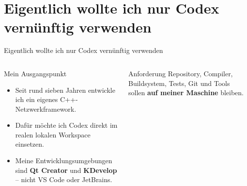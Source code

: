 \documentclass[\fhformat,10pt]{style/fh-ooe}
\newcommand{\CodexLink}{\href{https://github.com/openai/codex}{OpenAI Codex}}
\begin{document}

\section{Eigentlich wollte ich nur Codex vernünftig verwenden}
\begin{frame}{Eigentlich wollte ich nur Codex vernünftig verwenden}
\begin{columns}[T]
\centering
\vspace{0.75em}
\begin{block}{Mein Ausgangspunkt}
\begin{itemize}
  \item Seit rund sieben Jahren entwickle ich ein eigenes C++-Netzwerkframework.
  \item Dafür möchte ich Codex direkt im realen lokalen Workspace einsetzen.
  \item Meine Entwicklungsumgebungen sind \textbf{Qt Creator} und \textbf{KDevelop} -- nicht VS Code oder JetBrains.
\end{itemize}
\end{block}
\vspace{0.25em}
\begin{alertblock}{Anforderung}
Repository, Compiler, Buildsystem, Tests, Git und Tools sollen \textbf{auf meiner Maschine} bleiben.
\end{alertblock}
\end{columns}
\end{frame}

\end{document}
